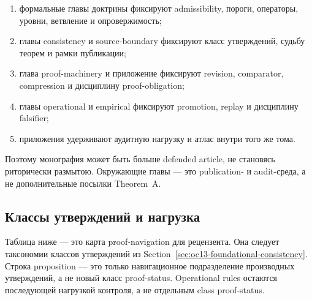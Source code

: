 \begin{enumerate}
\item формальные главы доктрины фиксируют admissibility, пороги, операторы, уровни, ветвление и опровержимость;
\item главы consistency и source-boundary фиксируют класс утверждений, судьбу теорем и рамки публикации;
\item глава proof-machinery и приложение фиксируют revision, comparator, compression и дисциплину proof-obligation;
\item главы operational и empirical фиксируют promotion, replay и дисциплину falsifier;
\item приложения удерживают аудитную нагрузку и атлас внутри того же тома.
\end{enumerate}

Поэтому монография может быть больше defended article, не становясь риторически размытою. Окружающие главы — это publication- и audit-среда, а не дополнительные посылки Theorem~A.

\subsection{Классы утверждений и нагрузка}

Таблица ниже — это карта proof-navigation для рецензента. Она следует таксономии классов утверждений из Section~\ref{sec:oc13-foundational-consistency}. Строка proposition — это только навигационное подразделение производных утверждений, а не новый класс proof-status. Operational rules остаются последующей нагрузкой контроля, а не отдельным class proof-status.

